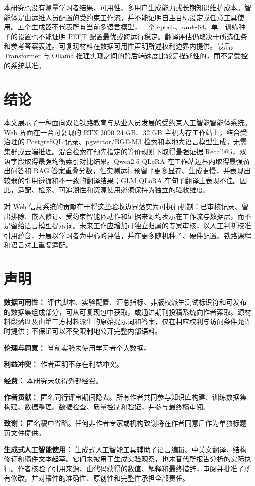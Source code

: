 本研究也没有测量学习者结果、可用性、多用户生成能力或长期知识维护成本。智能体是由运维人员配置的受约束工作流，并不能证明自主目标设定或任意工具使用。五个生成器不代表所有当前多语言模型，一个 epoch、rank-64、单一训练种子的设置也不能证明 PEFT 配置最优或跨运行稳定。翻译评估仍取决于所选任务和参考答案表述。可复现材料在数据可用性声明所述权利边界内提供。最后，Transformer 与 Ollama 推理实现之间的跨后端速度比较是描述性的，而不是受控的系统基准。

\section{结论}

本文展示了一种面向双语铁路教育与从业人员发展的受约束人工智能智能体系统。Web 界面在一台可复现的 RTX 3090 24 GB、32 GB 主机内存工作站上，结合受治理的 PostgreSQL 记录、pgvector/BGE-M3 检索和本地大语言模型生成，无需集群或云端推理。混合检索在预先指定的等价规则下取得最强证据 Recall@5，双语字段取得最强均衡索引对比结果。Qwen2.5 QLoRA 在工作站边界内取得最强留出问答和 RAG 答案重叠分数，但实测运行预留了更多显存、生成更慢，并表现出较弱的引用遵循和不一致的翻译结果；GLM QLoRA 在句子翻译上表现不佳。因此，适配、检索、可追溯性和资源使用必须保持为独立的验收维度。

对 Web 信息系统的贡献在于将这些验收边界落实为可执行机制：已审核记录、留出排除、嵌入修订、受约束智能体动作和证据来源均表示在工作流与数据层，而不是留给语言模型提示词。未来工作应增加可独立归属的专家审核，以人工判断校准引用蕴含，开展以学习者为中心的评估，并在更多随机种子、硬件配置、铁路课程和语言对上重复适配。

\section{声明}

\textbf{数据可用性：} 评估脚本、实验配置、汇总指标、非版权派生测试标识符和可发布的数据集组成部分，可从可复现包中获取，或通过期刊投稿系统向作者索取。源材料段落以及由第三方材料派生的原始提示词和答案，仅在相应权利与访问条件允许时提供；不保证可以不受限制地公开完整内部语料。

\textbf{伦理与同意：} 当前实验未使用学习者个人数据。

\textbf{利益冲突：} 作者声明不存在利益冲突。

\textbf{经费：} 本研究未获得外部经费。

\textbf{作者贡献：} 匿名同行评审期间隐去。所有作者共同参与知识库构建、训练数据集构建、数据整理、数据检查、质量控制和验证，并参与最终稿审阅。

\textbf{致谢：} 匿名稿中省略。任何非作者专家或机构致谢将在作者同意后作为单独标题页文件提供。

\textbf{生成式人工智能使用：} 生成式人工智能工具辅助了语言编辑、中英文翻译、结构修订和稿件文本起草。它们未被用于生成实验观察，也未替代所报告分析的实际执行。作者核验了引用来源、由代码获得的数值、解释和最终措辞，审阅并批准了所有修改，并对稿件的准确性、原创性和完整性承担全部责任。
